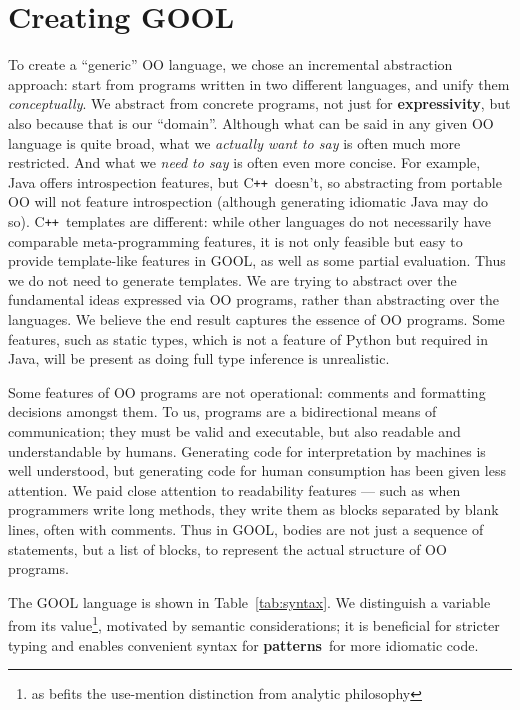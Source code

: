 \documentclass[sigplan,screen,10pt]{acmart}
\newcommand{\Cplusplus}{C\texttt{++}}
\newcommand{\abbrev}[1]{\textbf{#1}}
\newcommand{\oopatterns}{\abbrev{patterns}}
\newcommand{\expressivity}{\abbrev{expressivity}}
\begin{document}
\section{Creating GOOL} \label{sec:creating}

To create a ``generic'' OO language,
we chose an incremental abstraction approach: start from programs written in 
two different languages, and unify them \emph{conceptually}.
We abstract from concrete programs, not just for
\expressivity, but also because that is our ``domain''.  Although
what can be said in any given OO language is quite broad, what we
\emph{actually want to say} is often much more restricted. And what we
\emph{need to say} is often even more concise.
For example, Java offers introspection features, but \Cplusplus~doesn't, so
abstracting from portable OO will not feature introspection (although
generating idiomatic Java may do so). \Cplusplus~templates
are different: while other languages do not necessarily have comparable
meta-programming features, it is not only feasible but easy to provide
template-like features in GOOL, as well as some
partial evaluation. Thus we do not need to generate templates.
We are trying to abstract over the fundamental ideas
expressed via OO programs, rather than abstracting over the languages.
We believe the end result captures the essence of OO programs.
Some features, such as static types, which is not a feature of
Python but required in Java, will be present
as doing full type inference is unrealistic.

Some features of OO programs are not operational: comments and formatting
decisions amongst them.  To us, programs are a bidirectional means of
communication; they must be valid and executable, but
also readable and understandable by humans.
Generating code for interpretation by machines is well understood,
but generating code for human consumption has been given less 
attention. We paid close attention to readability features --- such
as when programmers write long methods, they write them as blocks separated
by blank lines, often with comments.
Thus in GOOL, bodies are not just a sequence of statements, but a 
list of blocks, to represent the actual structure of OO programs.

The GOOL language is shown in Table~\ref{tab:syntax}. We 
distinguish a variable from its value\footnote{as befits the use-mention
distinction from analytic philosophy}, motivated by
semantic considerations; it is beneficial for stricter typing and enables
convenient syntax for \oopatterns~for more idiomatic code.
\end{document}

